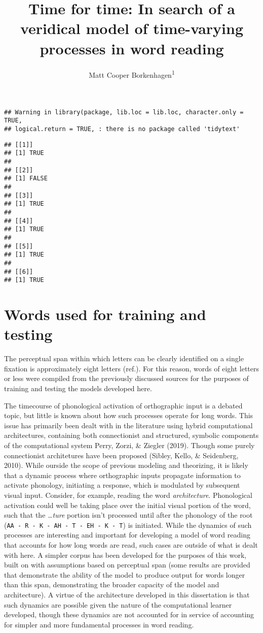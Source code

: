 \documentclass[
  american,
  man,floatsintext]{apa6}
\title{Time for time: In search of a veridical model of time-varying processes in word reading}
\author{Matt Cooper Borkenhagen\textsuperscript{1}}
\date{}
\affiliation{\vspace{0.5cm}\textsuperscript{1} Department of Psychology, University of Wisconsin, Madison}
\begin{document}
\maketitle

\begin{verbatim}
## Warning in library(package, lib.loc = lib.loc, character.only = TRUE,
## logical.return = TRUE, : there is no package called 'tidytext'
\end{verbatim}

\begin{verbatim}
## [[1]]
## [1] TRUE
## 
## [[2]]
## [1] FALSE
## 
## [[3]]
## [1] TRUE
## 
## [[4]]
## [1] TRUE
## 
## [[5]]
## [1] TRUE
## 
## [[6]]
## [1] TRUE
\end{verbatim}

\hypertarget{words-used-for-training-and-testing}{%
\section{Words used for training and testing}\label{words-used-for-training-and-testing}}

The perceptual span within which letters can be clearly identified on a single fixation is approximately eight letters (ref.). For this reason, words of eight letters or less were compiled from the previously discussed sources for the purposes of training and testing the models developed here.

The timecourse of phonological activation of orthographic input is a debated topic, but little is known about how such processes operate for long words. This issue has primarily been dealt with in the literature using hybrid computational architectures, containing both connectionist and structured, symbolic components of the computational system Perry, Zorzi, \& Ziegler (2019). Though some purely connectionist architetures have been proposed (Sibley, Kello, \& Seidenberg, 2010). While ourside the scope of previous modeling and theorizing, it is likely that a dynamic process where orthographic inputs propagate information to activate phonology, initiating a response, which is modulated by subsequent visual input. Consider, for example, reading the word \emph{architecture}. Phonological activation could well be taking place over the initial visual portion of the word, such that the \emph{\ldots ture} portion isn't processed until after the phonology of the root (\texttt{AA\ -\ R\ -\ K\ -\ AH\ -\ T\ -\ EH\ -\ K\ -\ T}) is initiated. While the dynamics of such processes are interesting and important for developing a model of word reading that accounts for how long words are read, such cases are outside of what is dealt with here. A simpler corpus has been developed for the purposes of this work, built on with assumptions based on perceptual span (some results are provided that demonstrate the ability of the model to produce output for words longer than this span, demonstrating the broader capacity of the model and architecture). A virtue of the architecture developed in this dissertation is that such dynamics are possible given the nature of the computational learner developed, though these dynamics are not accounted for in service of accounting for simpler and more fundamental processes in word reading.
\end{document}
